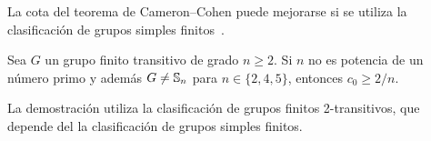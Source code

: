 La cota del teorema de Cameron--Cohen puede mejorarse si se utiliza la 
clasificación de grupos simples finitos~\cite{MR1484879}.  

\begin{theorem}
Sea $G$ un grupo finito transitivo de grado $n\geq2$. Si $n$ no es potencia de un 
número primo 
y además $G\ne\mathbb{S}_n$ para $n\in\{2,4,5\}$, entonces $c_0\geq 2/n$.
\end{theorem}

La demostración utiliza la clasificación de grupos finitos 2-transitivos, que depende del 
la clasificación de grupos simples finitos.



